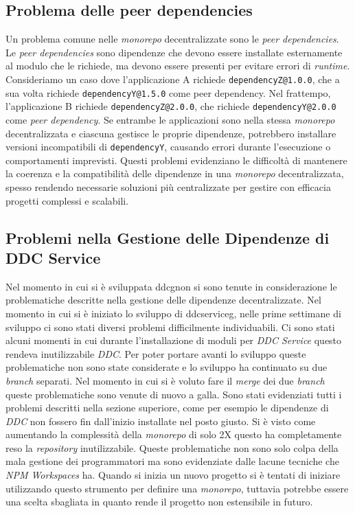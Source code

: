 \subsection{Problema delle peer dependencies}

Un problema comune nelle \textit{monorepo} decentralizzate sono le \textit{peer dependencies}. 
Le \textit{peer dependencies} sono dipendenze che devono essere installate esternamente al modulo che le richiede, ma devono essere presenti per evitare errori di \textit{runtime}.
Consideriamo un caso dove l'applicazione A richiede \texttt{dependencyZ@1.0.0}, che a sua volta richiede \texttt{dependencyY@1.5.0} come peer dependency.
Nel frattempo, l'applicazione B richiede \texttt{dependencyZ@2.0.0}, che richiede \texttt{dependencyY@2.0.0} come \textit{peer dependency}.
Se entrambe le applicazioni sono nella stessa \textit{monorepo} decentralizzata e ciascuna gestisce le proprie dipendenze, potrebbero installare versioni incompatibili di \texttt{dependencyY}, causando errori durante l'esecuzione o comportamenti imprevisti.
Questi problemi evidenziano le difficoltà di mantenere la coerenza e la compatibilità delle dipendenze in una \textit{monorepo} decentralizzata, spesso rendendo necessarie soluzioni più centralizzate per gestire con efficacia progetti complessi e scalabili.

\subsection{Problemi nella Gestione delle Dipendenze di DDC Service}
Nel momento in cui si è sviluppata \gls{ddcg}\glox non si sono tenute in considerazione le problematiche descritte nella gestione delle dipendenze decentralizzate.
Nel momento in cui si è iniziato lo sviluppo di \gls{ddcserviceg}\glox, nelle prime settimane di sviluppo ci sono stati diversi problemi difficilmente individuabili.
Ci sono stati alcuni momenti in cui durante l'installazione di moduli per \textit{DDC Service} questo rendeva inutilizzabile \textit{DDC}.
Per poter portare avanti lo sviluppo queste problematiche non sono state considerate e lo sviluppo ha continuato su due \textit{branch} separati.
Nel momento in cui si è voluto fare il \textit{merge} dei due \textit{branch} queste problematiche sono venute di nuovo a galla.
Sono stati evidenziati tutti i problemi descritti nella sezione superiore, come per esempio le dipendenze di \textit{DDC} non fossero fin dall'inizio installate nel posto giusto.
Si è visto come aumentando la complessità della \textit{monorepo} di solo 2X questo ha completamente reso la \textit{repository} inutilizzabile.
Queste problematiche non sono solo colpa della mala gestione dei programmatori ma sono evidenziate dalle lacune tecniche che \textit{NPM Workspaces} ha.
Quando si inizia un nuovo progetto si è tentati di iniziare utilizzando questo strumento per definire una \textit{monorepo}, tuttavia potrebbe essere una scelta sbagliata in quanto rende il progetto non estensibile in futuro.

